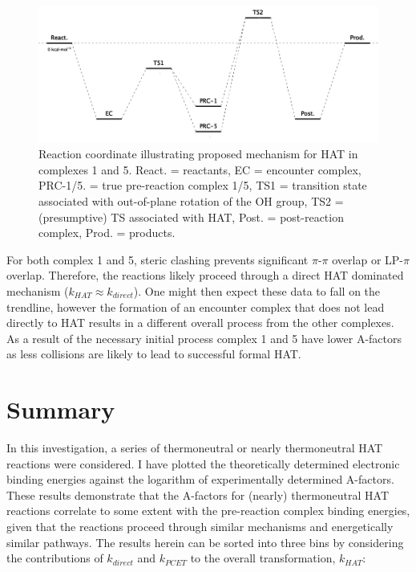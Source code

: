 
\begin{figure}[!htbp]
  \centering
  \includegraphics[width=\textwidth]{figures/encounter-pes.png}
  \caption[Reaction coordinate illustrating proposed mechanism for HAT in
  complexes 1 and 5.]{Reaction coordinate illustrating proposed mechanism for
  HAT in complexes 1 and 5. React. = reactants, EC = encounter complex,
  PRC-1/5. = true pre-reaction complex 1/5, TS1 = transition state associated
  with out-of-plane rotation of the OH group, TS2 = (presumptive) TS associated
  with HAT, Post. = post-reaction complex, Prod. = products.}
  \label{fig:encounter-pes}
\end{figure}

For both complex 1 and 5, steric clashing prevents significant $\pi$-$\pi$
overlap or LP-$\pi$ overlap. Therefore, the reactions likely proceed through a
direct HAT dominated mechanism ($k_{HAT} \approx k_{direct}$). One might then
expect these data to fall on the trendline, however the formation of an
encounter complex that does not lead directly to HAT results in a different
overall process from the other complexes. As a result of the necessary initial
process complex 1 and 5 have lower A-factors as less collisions are likely to
lead to successful formal HAT.


\section{Summary}

In this investigation, a series of thermoneutral or nearly thermoneutral HAT
reactions were considered. I have plotted the theoretically determined
electronic binding energies against the logarithm of experimentally determined
A-factors. These results demonstrate that the A-factors for (nearly)
thermoneutral HAT reactions correlate to some extent with the pre-reaction
complex binding energies, given that the reactions proceed through similar
mechanisms and energetically similar pathways. The results herein can be sorted
into three bins by considering the contributions of $k_{direct}$ and $k_{PCET}$
to the overall transformation, $k_{HAT}$:

